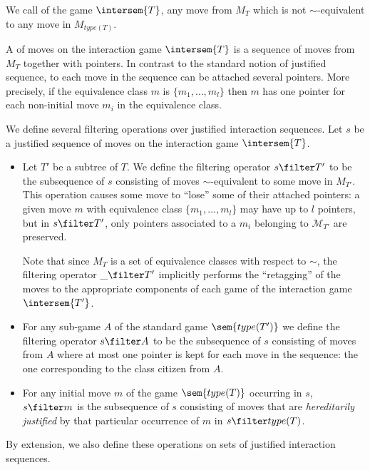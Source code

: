 We call  of the game $\intersem{T}$, any move
from $M_T$ which is not $\sim$-equivalent to any move in
$M_{type(T)}$.


A  of moves on the
interaction game $\intersem{T}$ is a sequence of moves from $M_T$
together with pointers. In contrast to the standard notion of
justified sequence, to each move in the sequence can be attached
several pointers. More precisely, if the equivalence class $m$ is
$\{m_1, \ldots, m_l \}$ then $m$ has one pointer for each
non-initial move $m_i$ in the equivalence class.

\begin{definition}[Filtering] We define several filtering operations
over justified interaction sequences. Let $s$ be a justified
sequence of moves on the interaction game $\intersem{T}$.
\begin{itemize}
\item  Let $T'$ be a subtree of $T$. We define the
filtering operator $s\filter T'$ to be the subsequence
of $s$ consisting of moves $\sim$-equivalent to some move in
$M_{T'}$. This operation causes some move to ``lose'' some of
their attached pointers: a given move $m$ with equivalence class
$\{m_1, \ldots, m_l \}$ may have up to $l$ pointers, but in
$s\filter T'$, only pointers associated to a $m_i$
belonging to $\mathcal{M}_{T'}$ are preserved.

Note that since $M_T$ is a set of equivalence classes with
respect to $\sim$, the filtering operator $\_ \filter T'$
implicitly performs the ``retagging'' of the moves to the
appropriate components of each game of the interaction game
$\intersem{T'}$.

\item  For any sub-game $A$ of the standard game $\sem{type(T')}$ we
define the filtering operator $s\filter A$ to be the
subsequence of $s$ consisting of moves from $A$ where at most
one pointer is kept for each move in the sequence: the one
corresponding to the class citizen from $A$.

\item For any initial move $m$ of the game $\sem{type(T)}$ occurring in $s$, $s
\filter m$ is the subsequence of $s$ consisting of moves
that are \emph{hereditarily justified} by that particular occurrence of $m$ in $s \filter type(T)$.
\end{itemize}
By extension, we also define these operations on sets of justified
interaction sequences.
\end{definition}

